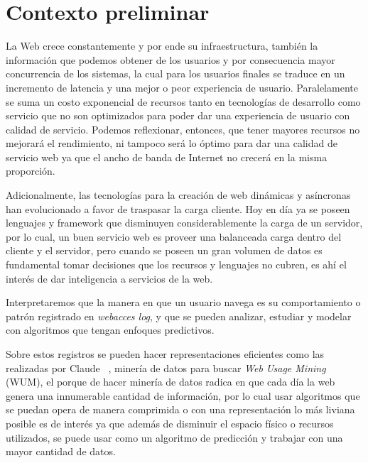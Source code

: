 \section{Contexto preliminar} 
\label{sec:preliminar}


  La Web crece constantemente y por ende su infraestructura, también la información que podemos obtener de los  usuarios y  por consecuencia mayor concurrencia de los sistemas, la cual para los usuarios finales se traduce en un incremento de latencia y una mejor o peor experiencia de usuario. Paralelamente se suma un costo exponencial de recursos tanto en tecnologías de desarrollo como servicio que no son optimizados para poder dar una experiencia de usuario con calidad de servicio. Podemos reflexionar, entonces, que tener mayores recursos no mejorará el rendimiento, ni tampoco será lo óptimo para dar una calidad de servicio web ya que el ancho de banda de Internet no crecerá en la misma proporción.
   
  Adicionalmente, las tecnologías para la creación de web dinámicas y asíncronas han evolucionado a favor de traspasar la carga cliente.
  Hoy en día ya se poseen lenguajes y {framework} que disminuyen considerablemente la carga de un servidor, por lo cual, un buen servicio web es proveer una balanceada carga dentro del cliente y el servidor, pero cuando se poseen un gran volumen de datos es fundamental tomar decisiones que los recursos y lenguajes no cubren, es ahí el interés de dar inteligencia a servicios de la web.

   Interpretaremos que la manera en que un usuario navega es su comportamiento o patrón registrado en \emph{webacces log}, y que se pueden analizar, estudiar y modelar con algoritmos que tengan enfoques predictivos. 

  Sobre estos registros se pueden hacer representaciones eficientes como las realizadas por Claude \etal~\cite{Claude2014},  minería de datos para buscar \emph{Web Usage Mining} (WUM), el porque de hacer minería de datos radica en que cada día la web genera una innumerable cantidad de información, por lo cual usar algoritmos que se puedan opera de manera comprimida o con una representación lo más liviana posible es de interés ya que además de disminuir el espacio físico o recursos utilizados, se puede usar como un algoritmo de predicción y trabajar con una mayor cantidad de datos.
  

